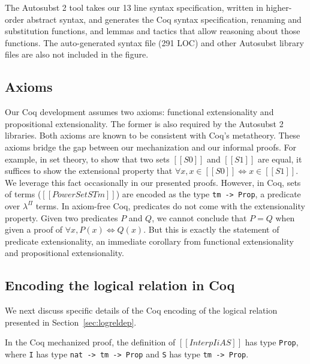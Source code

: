 \documentclass[\ifpublic nolinenum\else\fi,online,OA]{jfp}
\newcommand{\lang}{$\lambda^{\Pi}$\xspace}
\theoremstyle{definition}
\begin{document}
The Autosubst 2 tool takes our 13 line syntax specification, written in
higher-order abstract syntax, and generates the Coq syntax specification,
renaming and substitution functions, and lemmas and tactics that allow
reasoning about those functions. The auto-generated syntax file (291 LOC)
and other Autosubst library files are also not included in the figure.

\subsection{Axioms}
Our Coq development assumes two axioms: functional extensionality
and propositional extensionality. The former is also required by
the Autosubst 2 libraries. Both axioms are known to be consistent
with Coq's metatheory.
%
These axioms bridge the gap between our mechanization and our informal
proofs. For example, in set theory, to show that two sets $[[S0]]$ and
$[[S1]]$ are equal, it suffices to show the extensional property that
$\forall x, x \in [[S0]] \iff x \in [[S1]]$. We leverage this fact
occasionally in our presented proofs.
%
However, in Coq, sets of terms ($[[PowerSet STm]]$) are encoded as the 
type \texttt{tm
  -> Prop}, a predicate over \lang{} terms.  In axiom-free Coq, predicates do
not come with the extensionality property. Given two predicates $P$ and $Q$,
we cannot conclude that $P = Q$ when given a proof of
$\forall x, P(x) \iff Q(x)$. But this is exactly the statement of 
predicate extensionality, an immediate corollary from functional
extensionality and propositional extensionality.

\subsection{Encoding the logical relation in Coq}
We next discuss specific details of the Coq encoding of the logical relation
presented in Section~\ref{sec:logreldep}.

In the Coq mechanized proof, %
the definition of $[[Interp I i A S]]$ has type
\texttt{Prop}, where \texttt{I} has type \texttt{nat -> tm -> Prop} and \texttt{S} has type \texttt {tm -> Prop}.
\end{document}
